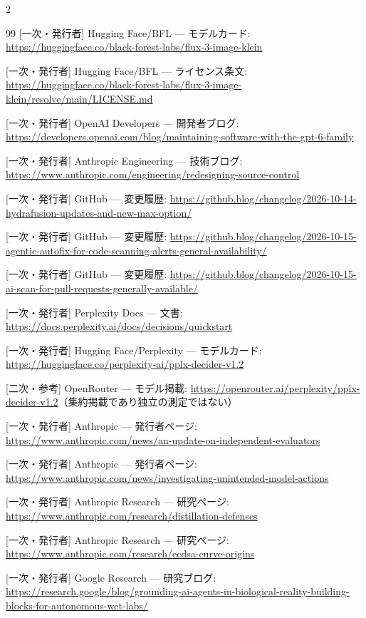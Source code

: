 \documentclass[lualatex,a4paper,10pt]{jlreq}
\begin{document}
\begin{multicols}{2}
\begin{thebibliography}{99}
 [一次・発行者] Hugging Face/BFL — モデルカード: \url{https://huggingface.co/black-forest-labs/flux-3-image-klein}

 [一次・発行者] Hugging Face/BFL — ライセンス条文: \url{https://huggingface.co/black-forest-labs/flux-3-image-klein/resolve/main/LICENSE.md}

 [一次・発行者] OpenAI Developers — 開発者ブログ: \url{https://developers.openai.com/blog/maintaining-software-with-the-gpt-6-family}

 [一次・発行者] Anthropic Engineering — 技術ブログ: \url{https://www.anthropic.com/engineering/redesigning-source-control}

 [一次・発行者] GitHub — 変更履歴: \url{https://github.blog/changelog/2026-10-14-hydrafusion-updates-and-new-max-option/}

 [一次・発行者] GitHub — 変更履歴: \url{https://github.blog/changelog/2026-10-15-agentic-autofix-for-code-scanning-alerts-general-availability/}

 [一次・発行者] GitHub — 変更履歴: \url{https://github.blog/changelog/2026-10-15-ai-scan-for-pull-requests-generally-available/}

 [一次・発行者] Perplexity Docs — 文書: \url{https://docs.perplexity.ai/docs/decisions/quickstart}

 [一次・発行者] Hugging Face/Perplexity — モデルカード: \url{https://huggingface.co/perplexity-ai/pplx-decider-v1.2}

 [二次・参考] OpenRouter — モデル掲載: \url{https://openrouter.ai/perplexity/pplx-decider-v1.2}（集約掲載であり独立の測定ではない）

 [一次・発行者] Anthropic — 発行者ページ: \url{https://www.anthropic.com/news/an-update-on-independent-evaluators}

 [一次・発行者] Anthropic — 発行者ページ: \url{https://www.anthropic.com/news/investigating-unintended-model-actions}

 [一次・発行者] Anthropic Research — 研究ページ: \url{https://www.anthropic.com/research/distillation-defenses}

 [一次・発行者] Anthropic Research — 研究ページ: \url{https://www.anthropic.com/research/ecdsa-curve-origins}

 [一次・発行者] Google Research — 研究ブログ: \url{https://research.google/blog/grounding-ai-agents-in-biological-reality-building-blocks-for-autonomous-wet-labs/}


\end{thebibliography}
\end{multicols}
\end{document}

